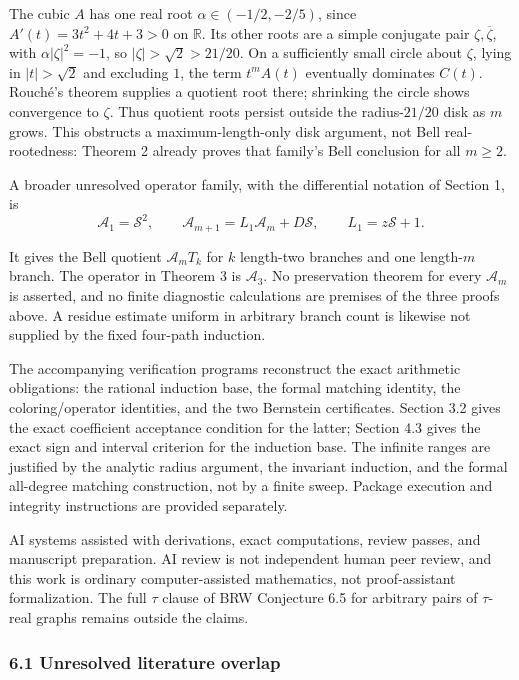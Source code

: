 \documentclass[
  11pt,
  a4paper,
]{article}
\begin{document}
The cubic \(A\) has one real root \(\alpha\in(-1/2,-2/5)\), since
\(A'(t)=3t^2+4t+3>0\) on \(\mathbb R\). Its other roots are a simple
conjugate pair \(\zeta,\overline\zeta\), with \(\alpha|\zeta|^2=-1\), so
\(|\zeta|>\sqrt2>21/20\). On a sufficiently small circle about
\(\zeta\), lying in \(|t|>\sqrt2\) and excluding \(1\), the term
\(t^mA(t)\) eventually dominates \(C(t)\). Rouché's theorem supplies a
quotient root there; shrinking the circle shows convergence to
\(\zeta\). Thus quotient roots persist outside the radius-\(21/20\) disk
as \(m\) grows. This obstructs a maximum-length-only disk argument, not
Bell real-rootedness: Theorem 2 already proves that family's Bell
conclusion for all \(m\geq2\).

A broader unresolved operator family, with the differential notation of
Section 1, is
\nopagebreak
\[
\mathcal A_1=\mathcal S^2,\qquad
\mathcal A_{m+1}=L_1\mathcal A_m+D\mathcal S,\qquad
L_1=z\mathcal S+1.\tag{41}
\]

It gives the Bell quotient \(\mathcal A_mT_k\) for \(k\) length-two
branches and one length-\(m\) branch. The operator in Theorem 3 is
\(\mathcal A_3\). No preservation theorem for every \(\mathcal A_m\) is
asserted, and no finite diagnostic calculations are premises of the
three proofs above. A residue estimate uniform in arbitrary branch count
is likewise not supplied by the fixed four-path induction.

The accompanying verification programs reconstruct the exact arithmetic
obligations: the rational induction base, the formal matching identity,
the coloring/operator identities, and the two Bernstein certificates.
Section 3.2 gives the exact coefficient acceptance condition for the
latter; Section 4.3 gives the exact sign and interval criterion for the
induction base. The infinite ranges are justified by the analytic radius
argument, the invariant induction, and the formal all-degree matching
construction, not by a finite sweep. Package execution and integrity
instructions are provided separately.

AI systems assisted with derivations, exact computations, review passes,
and manuscript preparation. AI review is not independent human peer
review, and this work is ordinary computer-assisted mathematics, not
proof-assistant formalization. The full \(\tau\) clause of BRW
Conjecture 6.5 for arbitrary pairs of \(\tau\)-real graphs remains
outside the claims.

\subsubsection{6.1 Unresolved literature
overlap}\label{unresolved-literature-overlap}
\end{document}
